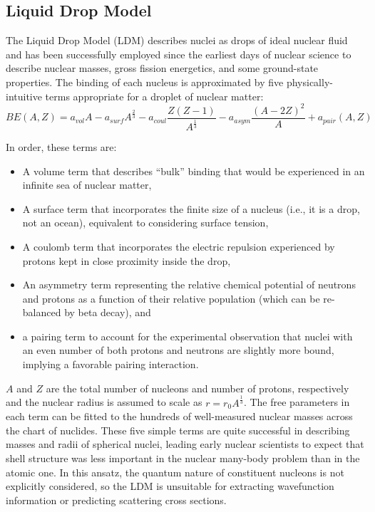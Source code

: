 \subsection{Liquid Drop Model}
The Liquid Drop Model (\gls{LDM}) describes nuclei as drops of ideal nuclear fluid and
has been successfully employed since the earliest days of nuclear science to
describe nuclear masses, gross fission energetics, and some ground-state properties.
The binding of each
nucleus is approximated by five physically-intuitive terms appropriate for
a droplet of nuclear matter:
\begin{equation} \label{LDM}
    BE(A,Z) = a_{vol}A - a_{surf}A^{\frac{2}{3}}
    -a_{coul}\frac{Z(Z-1)}{A^{\frac{1}{3}}}-a_{asym}\frac{(A-2Z)^{2}}{A}  +
        a_{pair}(A,Z)
\end{equation}

\noindent
In order, these terms are:
\begin{itemize}
    \item A volume term that describes ``bulk'' binding that would be experienced in an
        infinite sea of nuclear matter,
    \item A surface term that incorporates the finite size of a nucleus (i.e., it is a
        drop, not an ocean), equivalent to considering surface tension,
    \item A coulomb term that incorporates the electric repulsion experienced by protons
        kept in close proximity inside the drop,
    \item An asymmetry term representing the relative chemical potential of neutrons and
        protons as a function of their relative population (which can be re-balanced by
        beta decay), and
    \item a pairing term to account for the experimental observation that nuclei with an
        even number of both protons and neutrons are slightly more bound, implying a
        favorable pairing interaction.
\end{itemize}
$A$ and $Z$ are the total number of nucleons and number of protons,
respectively and the nuclear radius is assumed to scale as $r = r_{0} A^{\frac{1}{3}}$.
The free parameters in each term can be fitted to the
hundreds of well-measured nuclear masses
across the chart of nuclides. These five simple terms are quite successful
in describing masses and radii of spherical nuclei, leading early nuclear
scientists to expect that shell structure was less important in the nuclear
many-body problem than in the atomic one. In this ansatz, the quantum
nature of constituent nucleons is not explicitly considered, so the LDM is  
unsuitable for extracting wavefunction information or predicting scattering
cross sections.

